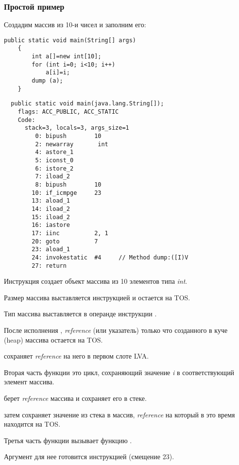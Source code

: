 \subsubsection{Простой пример}

Создадим массив из 10-и чисел и заполним его:

\begin{lstlisting}[style=customjava]
	public static void main(String[] args) 
	{
		int a[]=new int[10];
		for (int i=0; i<10; i++)
			a[i]=i;
		dump (a);
	}
\end{lstlisting}

\begin{lstlisting}
  public static void main(java.lang.String[]);
    flags: ACC_PUBLIC, ACC_STATIC
    Code:
      stack=3, locals=3, args_size=1
         0: bipush        10
         2: newarray       int
         4: astore_1      
         5: iconst_0      
         6: istore_2      
         7: iload_2       
         8: bipush        10
        10: if_icmpge     23
        13: aload_1       
        14: iload_2       
        15: iload_2       
        16: iastore       
        17: iinc          2, 1
        20: goto          7
        23: aload_1       
        24: invokestatic  #4     // Method dump:([I)V
        27: return        
\end{lstlisting}

Инструкция  создает объект массива из 10 элементов типа \emph{int}.

Размер массива выставляется инструкцией  и остается на \ac{TOS}.

Тип массива выставляется в операнде инструкции .

После исполнения , \emph{reference} (или указатель) только что созданного 
в куче (heap) массива остается на \ac{TOS}.

 сохраняет \emph{reference} на него в первом слоте \ac{LVA}.

Вторая часть функции \main это цикл, сохраняющий значение \emph{i} в соответствующий
элемент массива.

 берет \emph{reference} массива и сохраняет его в стеке.

 затем сохраняет значение из стека в массив, 
\emph{reference} на который в это время находится на \ac{TOS}.

Третья часть функции \main вызывает функцию .

Аргумент для нее готовится инструкцией  (смещение 23).

